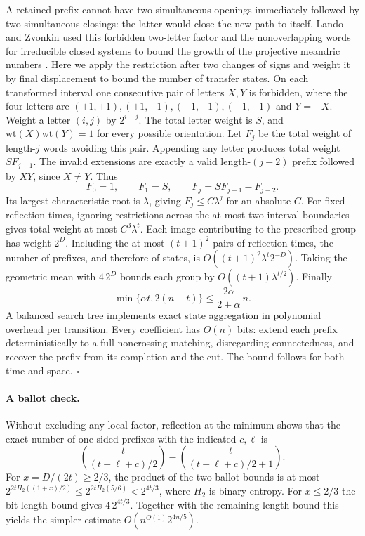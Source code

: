 A retained prefix cannot have two simultaneous openings immediately
followed by two simultaneous closings: the latter would close the new
path to itself. Lando and Zvonkin used this forbidden two-letter factor
and the nonoverlapping words for irreducible closed systems to bound
the growth of the projective meandric numbers
\cite[Lemma~3.3 and Theorem~3.4]{lz}. Here we apply the restriction after
two changes of signs and weight it by final displacement to bound the
number of transfer states. On each transformed interval one consecutive
pair of letters \(X,Y\) is forbidden, where the four letters are
\((+1,+1),(+1,-1),(-1,+1),(-1,-1)\) and \(Y=-X\).
Weight a letter \((i,j)\) by \(2^{i+j}\). The total letter weight is \(S\),
and \(\mathrm{wt}(X)\mathrm{wt}(Y)=1\) for every possible orientation.
Let \(F_j\) be the total weight of length-\(j\) words avoiding this pair.
Appending any letter produces total weight \(S F_{j-1}\). The invalid
extensions are exactly a valid length-\((j-2)\) prefix followed by \(XY\),
since \(X\ne Y\). Thus
\[
 F_0=1,\qquad F_1=S,\qquad F_j=S F_{j-1}-F_{j-2}.
\]
Its largest characteristic root is \(\lambda\), giving
\(F_j\le C\lambda^j\) for an absolute \(C\). For fixed reflection times,
ignoring restrictions across the at most two interval boundaries gives
total weight at most \(C^3\lambda^t\). Each image contributing to the
prescribed group has weight \(2^D\). Including the at most \((t+1)^2\)
pairs of reflection times, the number of prefixes, and therefore of
states, is \(O((t+1)^2\lambda^t 2^{-D})\). Taking the geometric mean
with \(4\,2^D\) bounds each group by \(O((t+1)\lambda^{t/2})\).
Finally
\[
 \min\{\alpha t,2(n-t)\}\le\frac{2\alpha}{2+\alpha}\,n .
\]
A balanced search tree implements exact state aggregation in polynomial
overhead per transition. Every coefficient has \(O(n)\) bits: extend each
prefix deterministically to a full noncrossing matching, disregarding
connectedness, and recover the prefix from its completion and the cut.
The bound follows for both time and space. \hfill\(\square\)

\paragraph{A ballot check.}
Without excluding any local factor, reflection at the minimum shows that
the exact number of one-sided prefixes with the indicated \(c,\ell\) is
\[
 \binom{t}{(t+\ell+c)/2}-\binom{t}{(t+\ell+c)/2+1}.
\]
For \(x=D/(2t)\ge2/3\), the product of the two ballot bounds is at most
\(2^{2tH_2((1+x)/2)}\le 2^{2tH_2(5/6)}<2^{4t/3}\), where \(H_2\) is binary
entropy. For \(x\le2/3\) the bit-length bound gives \(4\,2^{4t/3}\).
Together with the remaining-length bound this yields the simpler estimate
\(O(n^{O(1)}2^{4n/5})\).

